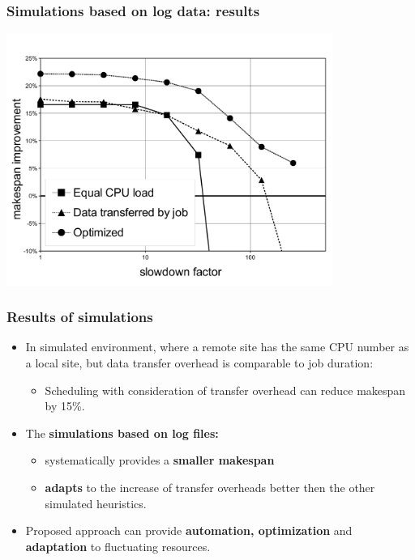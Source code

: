 \documentclass{beamer}
\begin{document}
\begin{frame}\frametitle{Simulations based on log data: results}
	\begin{center}
    \includegraphics[trim =5mm 5mm 5mm 10mm ,clip,width=0.8\textwidth]{pic/makespan_vs_slowdown4.pdf}
	\end{center}
\end{frame}

 	
\begin{frame}\frametitle{Results of simulations}
		\begin{itemize}
			\item In simulated environment, where a remote site has the same CPU number as a local site, but data transfer overhead is comparable to job duration: 
			\begin{itemize}
			\item Scheduling with consideration of transfer overhead can reduce makespan by 15\%.			\end{itemize}
			\item The \textbf{simulations based on log files:} 
			\begin{itemize}
			\item systematically provides a \textbf{smaller makespan}
			\item \textbf{adapts} to the increase of transfer overheads better then the other simulated  heuristics.
			\end{itemize}					
			\item Proposed approach can provide \textbf{automation, optimization} and \textbf{adaptation} to fluctuating resources.
		\end{itemize}		
\end{frame} 	
\end{document}
